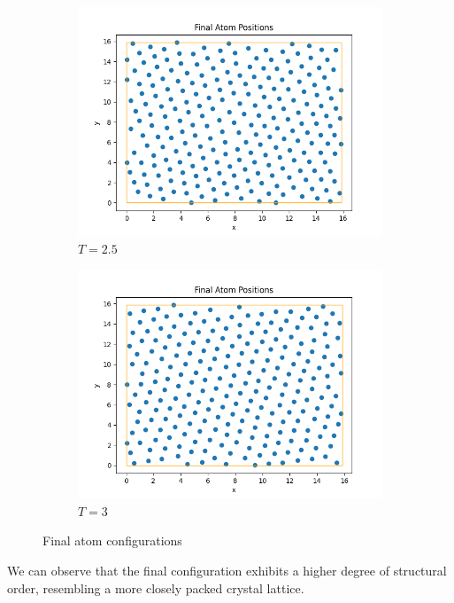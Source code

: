 \documentclass{article}
\begin{document}
\begin{figure}[H]
\begin{subfigure}{0.495\textwidth}
        \includegraphics[width=\textwidth]{images/Final2.5.png}
        \caption{$T=2.5$}
    \end{subfigure}
    \hfill
    \begin{subfigure}{0.495\textwidth}
        \centering
        \includegraphics[width=\textwidth]{images/Final3.png}
        \caption{$T=3$}
    \end{subfigure}
    
    \caption{Final atom configurations}
\end{figure}
\noindent We can observe that the final configuration exhibits a higher degree of structural order, resembling a more closely packed crystal lattice.\\\\
\end{document}
